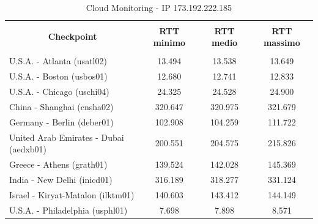 \documentclass[a4paper,11pt]{book}
\begin{document}
~

\begin{table}[!ht]
\begin{tabular}{|l|c|c|c|}
\hline
\multicolumn{1}{|c|}{\textbf{}} & {\textbf{}} & {\textbf{}} & {\textbf{}}\\
\multicolumn{1}{|c|}{\textbf{Checkpoint}} & {\textbf{RTT minimo}} & {\textbf{RTT medio}} & {\textbf{RTT massimo}}\\
\multicolumn{1}{|c|}{\textbf{}} & {\textbf{}} & {\textbf{}} & {\textbf{}}\\
\hline
U.S.A. - Atlanta (usatl02) & 13.494 & 13.538 & 13.649\\
U.S.A. - Boston (usbos01) & 12.680 & 12.741 & 12.833\\
U.S.A. - Chicago (uschi04) & 24.325 & 24.528 & 24.900\\
China - Shanghai (cnsha02) & 320.647 & 320.975 & 321.679\\
Germany - Berlin (deber01) & 102.908 & 104.259 & 111.722\\
United Arab Emirates - Dubai (aedxb01) & 200.551 & 204.575 & 215.826\\
Greece - Athens (grath01) & 139.524 & 142.028 & 145.369\\
India - New Delhi (inicd01) & 316.189 & 318.277 & 331.124\\
Israel - Kiryat-Matalon (ilktm01) & 140.603 & 143.412 & 144.149\\
U.S.A. - Philadelphia (usphl01) & 7.698 & 7.898 & 8.571\\
\hline
\end{tabular}
\caption{Cloud Monitoring - IP 173.192.222.185}\label{table:Monitoring_2}
\end{table}

~
\end{document}
